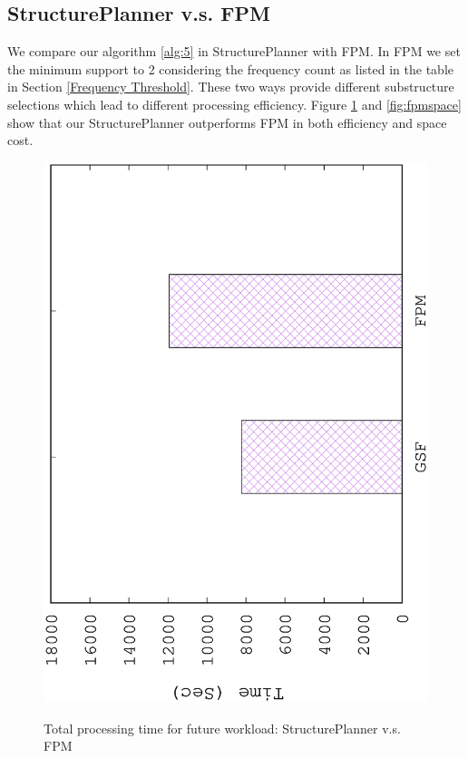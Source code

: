 \subsection{StructurePlanner v.s. FPM}
\label{StructurePlanner v.s. FPM}
We compare our algorithm \ref{alg:5} in StructurePlanner with FPM. In FPM we set the minimum support to 2 considering the frequency count as listed in the table in Section \ref{Frequency Threshold}. These two ways provide different substructure selections which lead to different processing efficiency. Figure \ref{fig:fpm} and \ref{fig:fpmspace} show that our StructurePlanner outperforms FPM in both efficiency and space cost.

\begin{figure}[H]
	\centering
	\includegraphics[scale=0.5, angle=270]{plot/fpm.eps}
	\label{fig:fpm}
	\caption{Total processing time for future workload: StructurePlanner v.s. FPM}
\end{figure}

